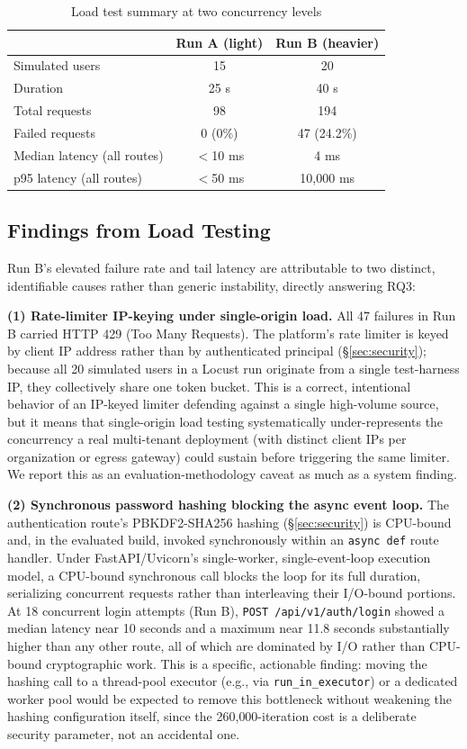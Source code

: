 \documentclass[conference]{IEEEtran}
\begin{document}
\begin{table}[h]
\caption{Load test summary at two concurrency levels}
\label{tab:loadtest}
\centering
\begin{tabular}{@{}lcc@{}}
\toprule
 & \textbf{Run A (light)} & \textbf{Run B (heavier)} \\
\midrule
Simulated users & 15 & 20 \\
Duration & 25 s & 40 s \\
Total requests & 98 & 194 \\
Failed requests & 0 (0\%) & 47 (24.2\%) \\
Median latency (all routes) & $<$10 ms & 4 ms \\
p95 latency (all routes) & $<$50 ms & 10{,}000 ms \\
\bottomrule
\end{tabular}
\end{table}

\subsection{Findings from Load Testing}
\label{sec:findings}
Run B's elevated failure rate and tail latency are attributable to two distinct, identifiable causes rather than generic instability, directly answering RQ3:

\textbf{(1) Rate-limiter IP-keying under single-origin load.} All 47 failures in Run B carried HTTP 429 (Too Many Requests). The platform's rate limiter is keyed by client IP address rather than by authenticated principal (\S\ref{sec:security}); because all 20 simulated users in a Locust run originate from a single test-harness IP, they collectively share one token bucket. This is a correct, intentional behavior of an IP-keyed limiter defending against a single high-volume source, but it means that single-origin load testing systematically under-represents the concurrency a real multi-tenant deployment (with distinct client IPs per organization or egress gateway) could sustain before triggering the same limiter. We report this as an evaluation-methodology caveat as much as a system finding.

\textbf{(2) Synchronous password hashing blocking the async event loop.} The authentication route's PBKDF2-SHA256 hashing (\S\ref{sec:security}) is CPU-bound and, in the evaluated build, invoked synchronously within an \texttt{async def} route handler. Under FastAPI/Uvicorn's single-worker, single-event-loop execution model, a CPU-bound synchronous call blocks the loop for its full duration, serializing concurrent requests rather than interleaving their I/O-bound portions. At 18 concurrent login attempts (Run B), \texttt{POST /api/v1/auth/login} showed a median latency near 10 seconds and a maximum near 11.8 seconds \textemdash{} substantially higher than any other route, all of which are dominated by I/O rather than CPU-bound cryptographic work. This is a specific, actionable finding: moving the hashing call to a thread-pool executor (e.g., via \texttt{run\_in\_executor}) or a dedicated worker pool would be expected to remove this bottleneck without weakening the hashing configuration itself, since the 260{,}000-iteration cost is a deliberate security parameter, not an accidental one.
\end{document}
